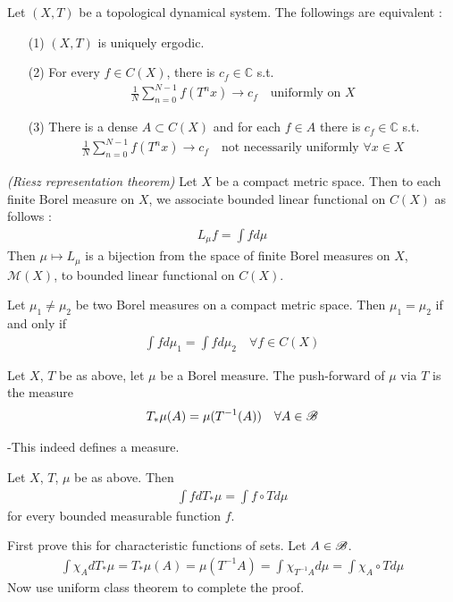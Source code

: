 \documentclass[12pt,a4paper]{report}
\newenvironment{proof}
{\begin{changemargin}{1cm}{0.5cm} 
	}%
	{\end{changemargin}
}
\begin{document}
\thm Let $(X,T)$ be a topological dynamical system. The followings are equivalent :
\begin{itemize}
\item[(1)] $(X,T)$ is uniquely ergodic.
\item[(2)] For every $f\in C(X)$, there is $c_f \in \mathbb{C}$ s.t. 
\begin{align*}
\frac{1}{N} \sum_{n=0}^{N-1} f(T^n x) \rightarrow c_f \quad \text{uniformly on } X
\end{align*}
\item[(3)]  There is a dense $A\subset C(X)$ and for each $f\in A$ there is $c_f \in \mathbb{C}$ s.t.
\begin{align*}
\frac{1}{N} \sum_{n=0}^{N-1} f(T^n x) \rightarrow c_f \quad \text{not necessarily uniformly } \forall x\in X
\end{align*}
\end{itemize}
\s

\thm \emph{(Riesz representation theorem)}  Let $X$ be a compact metric space. Then to each finite Borel measure on $X$, we associate bounded linear functional on $C(X)$ as follows : 
\begin{align*}
L_{\mu} f= \int f d\mu
\end{align*}
Then $\mu \mapsto L_{\mu}$ is a bijection from the space of finite Borel measures on $X$, $\mathscr{M}(X)$, to bounded linear functional on $C(X)$.
\s 

\cor Let $\mu_1 \neq \mu_2$ be two Borel measures on a compact metric space. Then $\mu_1 = \mu_2$ if and only if
\begin{align*}
\int f d\mu_1 = \int f d\mu_2 \quad \forall f \in C(X)
\end{align*}
\s

 Let $X$, $T$ be as above, let $\mu$ be a Borel measure. The push-forward of $\mu$ via $T$ is the measure
\begin{align*}
T_{*} \mu (A) = \mu(T^{-1}(A)) \quad \forall A\in \mathscr{B}
\end{align*}

-This indeed defines a measure.
\s

\lem Let $X$, $T$, $\mu$ be as above. Then
\begin{align*}
\int f dT_{*}\mu = \int f \circ T d\mu
\end{align*}
for every bounded measurable function $f$.
\begin{proof}
\pf First prove this for characteristic functions of sets. Let $A\in \mathscr{B}$.
\begin{align*}
\int \chi_A dT_* \mu = T_* \mu(A) = \mu(T^{-1} A) = \int \chi_{T^{-1} A } d\mu = \int \chi_A \circ T d\mu 
\end{align*}
Now use uniform class theorem to complete the proof.

\eop
\end{proof}
\s
\end{document}
